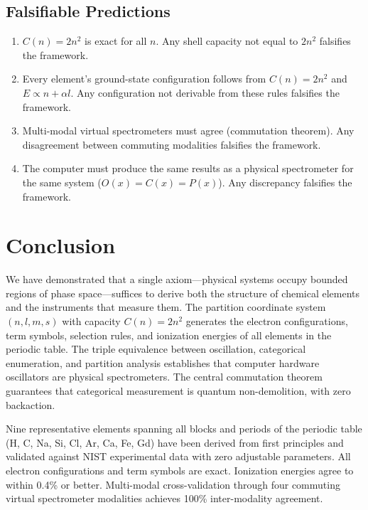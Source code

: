 \documentclass[11pt,twocolumn,a4paper]{article}
\theoremstyle{definition}
\theoremstyle{remark}
\begin{document}
\subsection{Falsifiable Predictions}

\begin{enumerate}
\item $C(n) = 2n^2$ is exact for all $n$. Any shell capacity not equal to $2n^2$ falsifies the framework.
\item Every element's ground-state configuration follows from $C(n) = 2n^2$ and $E \propto n + \alpha l$. Any configuration not derivable from these rules falsifies the framework.
\item Multi-modal virtual spectrometers must agree (commutation theorem). Any disagreement between commuting modalities falsifies the framework.
\item The computer must produce the same results as a physical spectrometer for the same system ($O(x) = C(x) = P(x)$). Any discrepancy falsifies the framework.
\end{enumerate}

\section{Conclusion}
\label{sec:conclusion}

We have demonstrated that a single axiom---physical systems occupy bounded regions of phase space---suffices to derive both the structure of chemical elements and the instruments that measure them. The partition coordinate system $(n, l, m, s)$ with capacity $C(n) = 2n^2$ generates the electron configurations, term symbols, selection rules, and ionization energies of all elements in the periodic table. The triple equivalence between oscillation, categorical enumeration, and partition analysis establishes that computer hardware oscillators are physical spectrometers. The central commutation theorem guarantees that categorical measurement is quantum non-demolition, with zero backaction.

Nine representative elements spanning all blocks and periods of the periodic table (H, C, Na, Si, Cl, Ar, Ca, Fe, Gd) have been derived from first principles and validated against NIST experimental data with zero adjustable parameters. All electron configurations and term symbols are exact. Ionization energies agree to within 0.4\% or better. Multi-modal cross-validation through four commuting virtual spectrometer modalities achieves 100\% inter-modality agreement.
\end{document}
